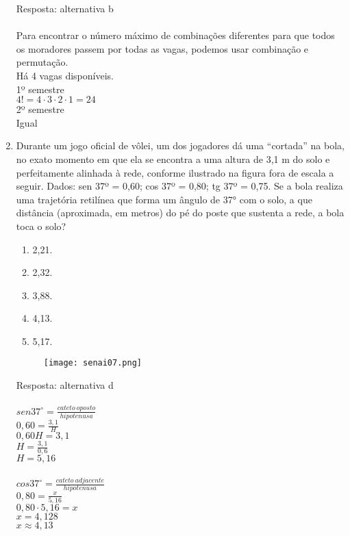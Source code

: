 \documentclass[a4paper,14pt]{article}
\begin{document}
\begin{enumerate}
        Resposta: alternativa b \\ \\
        Para encontrar o número máximo de combinações diferentes para que todos os moradores passem por todas as vagas, podemos usar combinação e permutação. \\
        Há 4 vagas disponíveis. \\
        1º semestre \\
        $4! = 4 \cdot 3 \cdot 2 \cdot 1 = 24$ \\
        2º semestre \\
        Igual \\
        \item Durante um jogo oficial de vôlei, um dos jogadores dá uma “cortada” na bola, no exato momento em que
        ela se encontra a uma altura de 3,1 m do solo e perfeitamente alinhada à rede, conforme ilustrado na
        figura fora de escala a seguir.
        \newline
        \newline 
        Dados: sen 37º = 0,60; cos 37º = 0,80; tg 37º = 0,75.
        \newline
        \newline
        Se a bola realiza uma trajetória retilínea que forma um ângulo de 37° com o solo, a que distância
        (aproximada, em metros) do pé do poste que sustenta a rede, a bola toca o solo?
        \begin{enumerate}
        	\item 2,21.
        	\item 2,32.
        	\item 3,88.
        	\item 4,13.
        	\item 5,17.
        \end{enumerate}
	    \begin{figure}[h] %
	    	\centering
	    	\texttt{[image: senai07.png]} %
	    \end{figure}
	    
    
    
        Resposta: alternativa d \\ \\
        $sen 37^{\circ} = \frac{cateto~oposto}{hipotenusa}$ \\
        $0,60 = \frac{3,1}{H}$ \\
        $0,60H = 3,1$ \\
        $H = \frac{3,1}{0,6}$ \\
        $H = 5,16$ \\ \\
        $cos 37^{\circ} = \frac{cateto~adjacente}{hipotenusa}$ \\
        $0,80 = \frac{x}{5,16}$ \\
        $0,80 \cdot 5,16 = x$ \\
        $x = 4,128$ \\
        $x \approx 4,13$ \\ \\
    

\end{enumerate}
\end{document}
